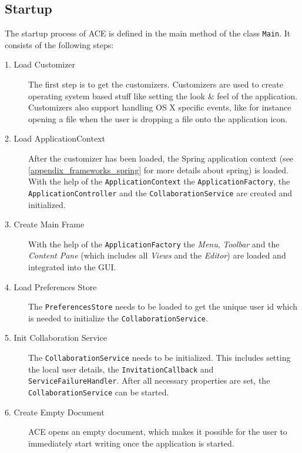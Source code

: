 \subsection{Startup}
\label{applicationlayer_wf_startup}
The startup process of ACE is defined in the main method of the class \texttt{Main}. It consists of the following steps:
\begin{description}
\item[1. Load Customizer ] The first step is to get the customizers. Customizers are used to create operating system based stuff like setting the look \& feel of the application. Customizers also support handling OS X specific events, like for instance opening a file when the user is dropping a file onto the application icon.
\item[2. Load ApplicationContext ] After the customizer has been loaded, the Spring application context (see \ref{appendix_frameworks_spring} for more details about spring) is loaded. With the help of the \texttt{Application\-Context} the \texttt{Application\-Factory}, the \texttt{Application\-Controller} and the \texttt{Collaboration\-Service} are created and initialized.
\item[3. Create Main Frame ] With the help of the \texttt{Application\-Factory} the \emph{Menu}, \emph{Toolbar} and the \emph{Content Pane} (which includes all \emph{Views} and the \emph{Editor}) are loaded and integrated into the GUI.
\item[4. Load Preferences Store ] The \texttt{Preferences\-Store} needs to be loaded to get the unique user id which is needed to initialize the \texttt{Collaboration\-Service}.
\item[5. Init Collaboration Service ] The \texttt{Collaboration\-Service} needs to be initialized. This includes setting the local user details, the \texttt{Invitation\-Callback} and \texttt{Service\-Failure\-Handler}. After all necessary properties are set, the \texttt{Collaboration\-Service} can be started.
\item[6. Create Empty Document ] ACE opens an empty document, which makes it possible for the user to immediately start writing once the application is started.
\end{description}

